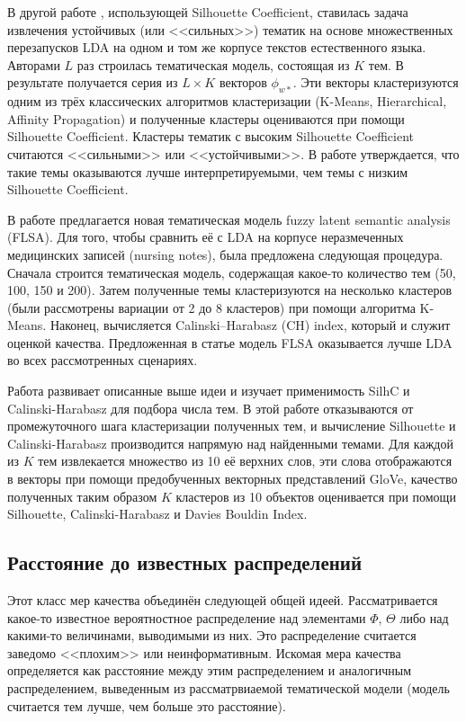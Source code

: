 В другой работе \cite{mehta_clustering_bank}, использующей Silhouette Coefficient, ставилась задача извлечения устойчивых (или <<сильных>>) тематик на основе множественных перезапусков LDA на одном и том же корпусе текстов естественного языка. Авторами $L$ раз строилась тематическая модель, состоящая из $K$ тем. В результате получается серия из $L \times K$ векторов $\phi_{w \ast}$. Эти векторы кластеризуются одним из трёх классических алгоритмов кластеризации (K-Means, Hierarchical, Affinity Propagation) и полученные кластеры оцениваются при помощи Silhouette Coefficient. Кластеры тематик с высоким Silhouette Coefficient считаются <<сильными>> или <<устойчивыми>>. В работе утверждается, что такие темы оказываются лучше интерпретируемыми, чем темы с низким Silhouette Coefficient.

В работе \cite{karami2018fuzzy} предлагается новая тематическая модель fuzzy latent semantic analysis (FLSA). Для того, чтобы сравнить её с LDA на корпусе неразмеченных медицинских записей (nursing notes), была предложена следующая процедура. Сначала строится тематическая модель, содержащая какое-то количество тем (50, 100, 150 и 200). Затем полученные темы кластеризуются на несколько кластеров (были рассмотрены вариации от 2 до 8 кластеров) при помощи алгоритма K-Means. Наконец, вычисляется Calinski–Harabasz (CH) index, который и служит оценкой качества. Предложенная в статье модель FLSA оказывается лучше LDA во всех рассмотренных сценариях.

Работа \cite{krasnov19clustering} развивает описанные выше идеи и изучает применимость SilhC и Calinski-Harabasz для подбора числа тем. В этой работе отказываются от промежуточного шага кластеризации полученных тем, и вычисление Silhouette и Calinski-Harabasz производится напрямую над найденными темами. Для каждой из $K$ тем извлекается множество из 10 её верхних слов, эти слова отображаются в векторы при помощи предобученных векторных представлений GloVe, качество полученных таким образом $K$ кластеров из 10 объектов оценивается при помощи Silhouette, Calinski-Harabasz и Davies Bouldin Index.

\subsection{Расстояние до известных распределений}

Этот класс мер качества объединён следующей общей идеей. Рассматривается какое-то известное вероятностное распределение над элементами $\Phi$, $\Theta$ либо над какими-то величинами, выводимыми из них. Это распределение считается заведомо <<плохим>> или неинформативным. Искомая мера качества определяется как расстояние между этим распределением и аналогичным распределением, выведенным из рассматрвиаемой тематической модели (модель считается тем лучше, чем больше это расстояние).

